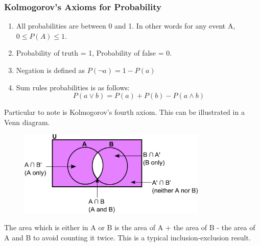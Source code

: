 \documentclass{article}
\begin{document}
\subsubsection{Kolmogorov's Axioms for Probability}
\begin{enumerate}
\item All probabilities are between 0 and 1. In other words for any event A, $0 \leq P(A) \leq 1$.
\item Probability of truth = 1, Probability of false = 0.
\item Negation is defined as $P(\neg a) = 1 - P(a)$
\item Sum rules probabilities is as follows:
\begin{equation}
P(a \vee b) = P(a) + P(b) - P(a \wedge b)
\end{equation}
\end{enumerate}
Particular to note is Kolmogorov's fourth axiom. This can be illustrated in a Venn diagram.
\begin{figure}[H]
\centering
\includegraphics[width=0.8\textwidth, keepaspectratio]{imgs/kolmogorov-fourth.png}
\end{figure}
\noindent
The area which is either in A or B is the area of A + the area of B - the area of A and B to avoid counting it twice. This is a typical inclusion-exclusion result.
\end{document}
